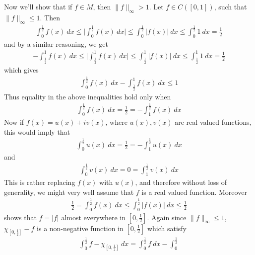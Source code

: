 \documentclass[12pt]{exam}
\theoremstyle{plain} %
\theoremstyle{definition} %
\theoremstyle{remark} %
\begin{document}
\begin{questions}
\begin{solution}
    Now we'll show that if $ f \in M$, then $ \|f\|_\infty > 1$.
    Let $f \in C([0, 1])$, such that $\|f\|_\infty \le 1$.
    Then
    \begin{align*}
      \int_{0}^{\frac{1}{2}} f(x) \ dx \le  \Big |
      \int_{0}^{\frac{1}{2}} f(x) \ dx \Big | \le
      \int_{0}^{\frac{1}{2}} |f(x)| \ dx \le \int_{0}^{\frac{1}{2}} 1
      \ dx = \frac{1}{2}
    \end{align*}
    and by a similar reasoning, we get
    \begin{align*}
      - \int_{\frac{1}{2}}^{1} f(x) \ dx \le
      \Big|\int_{\frac{1}{2}}^{1} f(x) \ dx\Big| \le
      \int_{\frac{1}{2}}^{1} |f(x)| \ dx \le \int_{\frac{1}{2}}^{1} 1
      \ dx = \frac{1}{2}
    \end{align*}
    which gives
    \begin{align*}
      \int_{0}^{\frac{1}{2}} f(x) \ dx - \int^{1}_{\frac{1}{2}} f(x) \ dx \le 1
    \end{align*}
    Thus equality in the above inequalities hold only when
    \begin{align*}
      \int_{0}^{\frac{1}{2}} f(x) \ dx = \frac{1}{2} = -
      \int_{1}^{\frac{1}{2}} f(x) \ dx
    \end{align*}
    Now if $f(x) = u(x) + iv(x)$, where $u(x), v(x)$ are real valued
    functions, this would imply that
    \begin{align*}
      \int_{0}^{\frac{1}{2}} u(x) \ dx = \frac{1}{2} = -
      \int_{1}^{\frac{1}{2}} u(x) \ dx
    \end{align*}
    and
    \begin{align*}
      \int_{0}^{\frac{1}{2}} v(x) \ dx = 0 =
      \int_{1}^{\frac{1}{2}} v(x) \ dx
    \end{align*}
    This is rather replacing $f(x)$ with $u(x)$, and therefore
    without loss of generality, we might very well assume that $f$ is
    a real valued function. Moreover
    \begin{align*}
      \frac{1}{2} = \int_{0}^{\frac{1}{2}} f(x) \ dx \le
      \int_{0}^{\frac{1}{2}} |f(x)| \ dx \le \frac{1}{2}
    \end{align*}
    shows that $f = |f|$ almost everywhere in $[0, \frac{1}{2}]$.
    Again since $\|f\|_\infty \le 1$, \  $\chi_[0, \frac{1}{2}] - f$ is
    a non-negative function in $[0, \frac{1}{2}]$
    which satisfy
    \begin{align*}
      \int_{0}^{\frac{1}{2}} f - \chi_{[0, \frac{1}{2}]} \ dx =
      \int_{0}^{\frac{1}{2}} f \ dx - \int_{0}^{\frac{1}{2}}

\end{align*}
\end{solution}
\end{questions}
\end{document}
